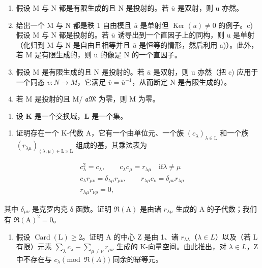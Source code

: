 \begin{enumerate}
\def\labelenumi{\alph{enumi})}
\item
  假设 M 与 N 都是有限生成的且 N 是投射的。若 \(\overline{u}\) 是双射，则 u 亦然。
\item
  给出一个 M 与 N 都是秩 1 自由模且 \(\overline{u}\) 是单射但 \(\operatorname{Ker}(u) \neq 0\) 的例子。c) 假设 M 与 N 都是投射的。若 \(\overline{u}\) 诱导出到一个直因子上的同构，则 u 是单射（化归到 M 与 N 是自由且相等并且 \(\overline{u}\) 是恒等的情形，然后利用 a)）。此外，若 M 是有限生成的，则 u 的像是 N 的一个直因子。
\item
  假设 M 是有限生成的且 N 是投射的。若 \(\overline{u}\) 是双射，则 u 亦然（把 c) 应用于一个同态 \(v: N \to M\)，它满足 \(\overline{v} = \overline{u}^{-1}\)，从而断定 N 是有限生成的）。
\item
  若 M 是投射的且 M/ \(\mathfrak{aM}\) 为零，则 M 为零。
\end{enumerate}

\begin{enumerate}
\def\labelenumi{\arabic{enumi})}
\setcounter{enumi}{16}
\tightlist
\item
  设 \(\mathbf{K}\) 是一个交换域，\(\mathbf{L}\) 是一个集。
\end{enumerate}

\begin{enumerate}
\def\labelenumi{\alph{enumi})}
\tightlist
\item
  证明存在一个 K-代数 A，它有一个由单位元、一个族 \((c_{\lambda})_{\lambda \in \mathrm{L}}\) 和一个族 \((r_{\lambda \mu})_{(\lambda ,\mu)\in \mathrm{L}\times \mathrm{L}}\) 组成的基，其乘法表为
\end{enumerate}

\[
\begin{array}{r} c _ {\lambda} ^ {2} = c _ {\lambda}, \qquad c _ {\lambda} c _ {\mu} = r _ {\lambda \mu} \quad \mathrm{if} \lambda \neq \mu \\ c _ {\lambda} r _ {\mu \nu} = \delta_ {\lambda \mu} r _ {\mu \nu}, \qquad r _ {\lambda \mu} c _ {\nu} = \delta_ {\mu \nu} r _ {\lambda \mu} \\ r _ {\lambda \mu} r _ {\nu \rho} = 0, \end{array}
\]

其中 \(\delta_{\mu\nu}\) 是克罗内克 δ 函数。证明 \(\Re(\mathrm{A})\) 是由诸 \(r_{\lambda\mu}\) 生成的 A 的子代数；我们有 \(\Re(\mathrm{A})^{2}=0\)。

\begin{enumerate}
\def\labelenumi{\alph{enumi})}
\setcounter{enumi}{1}
\tightlist
\item
  假设 \(\operatorname{Card}(\mathrm{L}) \geqslant 2\)。证明 A 的中心 Z 是由 1、诸 \(r_{\lambda\lambda}\)（\(\lambda \in L\)）以及（若 L 有限）元素 \(\sum_{\lambda} c_{\lambda} - \sum_{\mu \neq \nu} r_{\mu\nu}\) 生成的 K-向量空间。由此推出，对 \(\lambda \in L\)，Z 中不存在与 \(c_{\lambda} \pmod{\Re(A)}\) 同余的幂等元。
\end{enumerate}

